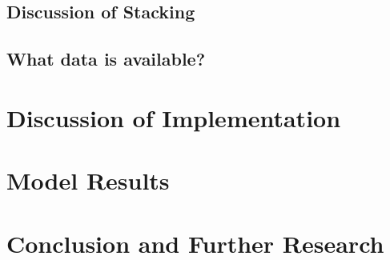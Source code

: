 \documentclass[10pt,a4paper, hidelinks]{article} %
\begin{document}
\subsection{Discussion of Stacking}
\lipsum
\subsection{What data is available?}
\lipsum
\section{Discussion of Implementation}
\lipsum

\section{Model Results}
\lipsum

\section{Conclusion and Further Research}
\lipsum
\end{document}
